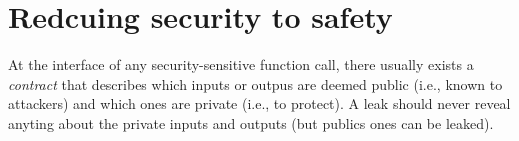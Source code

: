 \section{Redcuing security to safety}





At the interface of any security-sensitive function call, there usually exists a
\emph{contract} that describes which inputs or outpus are deemed public (i.e.,
known to attackers) and which ones are private (i.e., to protect). A leak should
never reveal anyting about the private inputs and outputs (but publics ones 
can be leaked).


